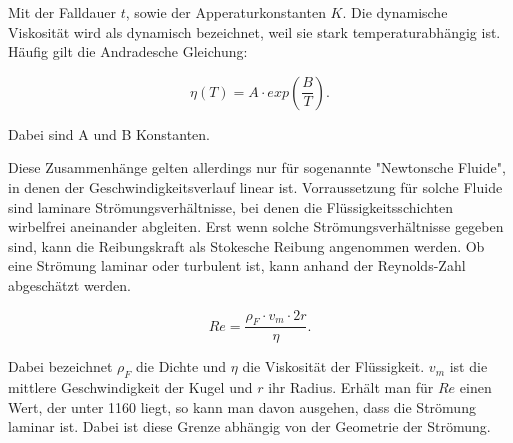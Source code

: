 Mit der Falldauer $t$, sowie der Apperaturkonstanten $K$.
Die dynamische Viskosität wird als dynamisch bezeichnet, weil sie stark 
temperaturabhängig ist. Häufig gilt die Andradesche Gleichung:

\begin{equation}
\eta (T) = A\cdot exp{\left(\frac{B}{T}\right)}.
\end{equation}

Dabei sind A und B Konstanten. 

Diese Zusammenhänge gelten allerdings nur für sogenannte "Newtonsche Fluide",
in denen der Geschwindigkeitsverlauf linear ist. Vorraussetzung für solche 
Fluide sind laminare Strömungsverhältnisse, bei denen die Flüssigkeitsschichten
wirbelfrei aneinander abgleiten. Erst wenn solche Strömungsverhältnisse gegeben 
sind, kann die Reibungskraft als Stokesche Reibung angenommen werden. 
Ob eine Strömung laminar oder turbulent ist, kann anhand der Reynolds-Zahl 
abgeschätzt werden. 

\begin{equation}
Re = \frac{\rho _F\cdot v_m\cdot 2r}{\eta}.
\label{eqn:Reynolds}
\end{equation}

Dabei bezeichnet $\rho _F$ die Dichte und $\eta$ die Viskosität der Flüssigkeit. 
$v_m$ ist die mittlere Geschwindigkeit der Kugel und $r$ ihr Radius.
Erhält man für $Re$ einen Wert, der unter 1160 liegt, so kann man davon ausgehen, 
dass die Strömung laminar ist. Dabei ist diese Grenze abhängig von der 
Geometrie der Strömung. 
